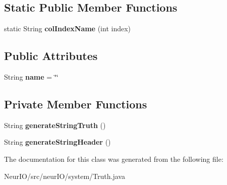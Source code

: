 \subsection*{Static Public Member Functions}
\begin{DoxyCompactItemize}
\item 
\mbox{\label{classneur_i_o_1_1system_1_1_truth_a111599cd27bfb1e906cad589313c02d7}} 
static String {\bfseries col\+Index\+Name} (int index)
\end{DoxyCompactItemize}
\subsection*{Public Attributes}
\begin{DoxyCompactItemize}
\item 
\mbox{\label{classneur_i_o_1_1system_1_1_truth_a73e0e02b8591832131d0c26d1f88dea2}} 
String {\bfseries name} = \char`\"{}\char`\"{}
\end{DoxyCompactItemize}
\subsection*{Private Member Functions}
\begin{DoxyCompactItemize}
\item 
\mbox{\label{classneur_i_o_1_1system_1_1_truth_ab87b56891179c3a4409c0b953867453a}} 
String {\bfseries generate\+String\+Truth} ()
\item 
\mbox{\label{classneur_i_o_1_1system_1_1_truth_a36c7d311f47af72a2fe8d4689de4d9c1}} 
String {\bfseries generate\+String\+Header} ()
\end{DoxyCompactItemize}


The documentation for this class was generated from the following file\+:\begin{DoxyCompactItemize}
\item 
Neur\+I\+O/src/neur\+I\+O/system/Truth.\+java\end{DoxyCompactItemize}
